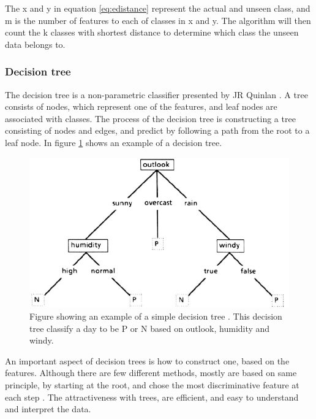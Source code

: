 \documentclass[USenglish]{ifimaster}  %
\begin{document}
The x and y in equation \ref{eq:edistance} represent the actual and unseen class, and m is the number of features to each of classes in x and y. The algorithm will then count the k classes with shortest distance to determine which class the unseen data belongs to.
	
	
\subsubsection{Decision tree}
The decision tree is a non-parametric classifier presented by JR Quinlan \cite{Quinlan1986}. A tree consists of nodes, which represent one of the features, and leaf nodes are associated with classes. The process of the decision tree is constructing a tree consisting of nodes and edges, and predict by following a path from the root to a leaf node. In figure \ref{fig:decisiontree} shows an example of a decision tree.


	
\begin{figure}[h]
		\centering
		\includegraphics[scale=0.5]{Figures/decisionTree.PNG}
		\caption{Figure showing an example of a simple decision tree \cite{Quinlan1986}. This decision tree classify a day to be P or N based on outlook, humidity and windy.}
		\label{fig:decisiontree}
\end{figure}
\FloatBarrier

An important aspect of decision trees is how to construct one, based on the features. Although there are few different methods, mostly are based on same principle, by starting at the root, and chose the most discriminative feature at each step \cite{Marsland:2009:MLA:1571643}. The attractiveness with trees, are efficient, and easy to understand and interpret the data. 
\end{document}
